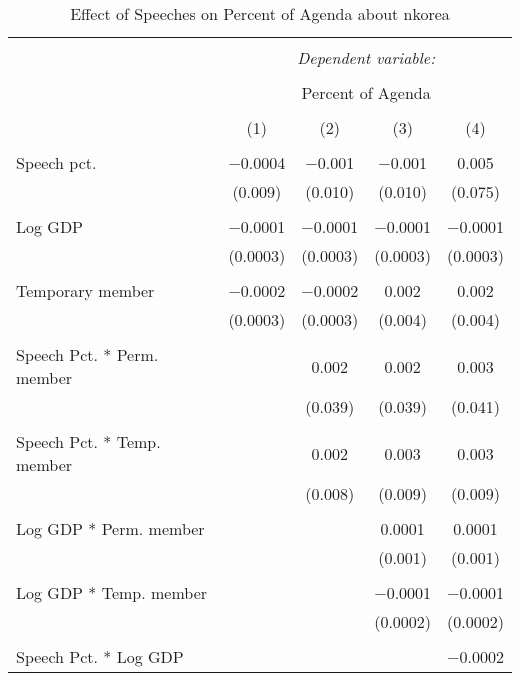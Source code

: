 
\begin{table}[!htbp] \centering 
  \caption{Effect of Speeches on Percent of Agenda about  nkorea} 
  \label{} 
\begin{tabular}{@{\extracolsep{5pt}}lcccc} 
\\[-1.8ex]\hline 
\hline \\[-1.8ex] 
 & \multicolumn{4}{c}{\textit{Dependent variable:}} \\ 
\cline{2-5} 
\\[-1.8ex] & \multicolumn{4}{c}{Percent of Agenda} \\ 
\\[-1.8ex] & (1) & (2) & (3) & (4)\\ 
\hline \\[-1.8ex] 
 Speech pct. & $-$0.0004 & $-$0.001 & $-$0.001 & 0.005 \\ 
  & (0.009) & (0.010) & (0.010) & (0.075) \\ 
  & & & & \\ 
 Log GDP & $-$0.0001 & $-$0.0001 & $-$0.0001 & $-$0.0001 \\ 
  & (0.0003) & (0.0003) & (0.0003) & (0.0003) \\ 
  & & & & \\ 
 Temporary member & $-$0.0002 & $-$0.0002 & 0.002 & 0.002 \\ 
  & (0.0003) & (0.0003) & (0.004) & (0.004) \\ 
  & & & & \\ 
 Speech Pct. * Perm. member &  & 0.002 & 0.002 & 0.003 \\ 
  &  & (0.039) & (0.039) & (0.041) \\ 
  & & & & \\ 
 Speech Pct. * Temp. member &  & 0.002 & 0.003 & 0.003 \\ 
  &  & (0.008) & (0.009) & (0.009) \\ 
  & & & & \\ 
 Log GDP * Perm. member &  &  & 0.0001 & 0.0001 \\ 
  &  &  & (0.001) & (0.001) \\ 
  & & & & \\ 
 Log GDP * Temp. member &  &  & $-$0.0001 & $-$0.0001 \\ 
  &  &  & (0.0002) & (0.0002) \\ 
  & & & & \\ 
 Speech Pct. * Log GDP &  &  &  & $-$0.0002 \\ 

\end{tabular}
\end{table}
